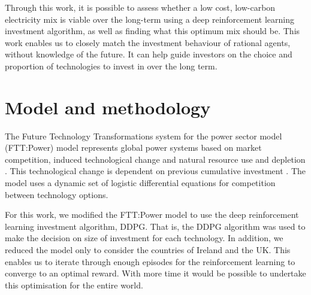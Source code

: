 \documentclass{article}
\begin{document}
Through this work, it is possible to assess whether a low cost, low-carbon electricity mix is viable over the long-term using a deep reinforcement learning investment algorithm, as well as finding what this optimum mix should be. This work enables us to closely match the investment behaviour of rational agents, without knowledge of the future. It can help guide investors on the choice and proportion of technologies to invest in over the long term.




\section{Model and methodology}
\label{sec:methods}


The Future Technology Transformations system for the power sector model (FTT:Power) model represents global power systems based on market competition, induced technological change and natural resource use and depletion \cite{Mercure2012}. This technological change is dependent on previous cumulative investment \cite{Mercure2012}. The model uses a dynamic set of logistic differential equations for competition between technology options.

For this work, we modified the FTT:Power model to use the deep reinforcement learning investment algorithm, DDPG. That is, the DDPG algorithm was used to make the decision on size of investment for each technology. In addition, we reduced the model only to consider the countries of Ireland and the UK. This enables us to iterate through enough episodes for the reinforcement learning to converge to an optimal reward. With more time it would be possible to undertake this optimisation for the entire world.
\end{document}
